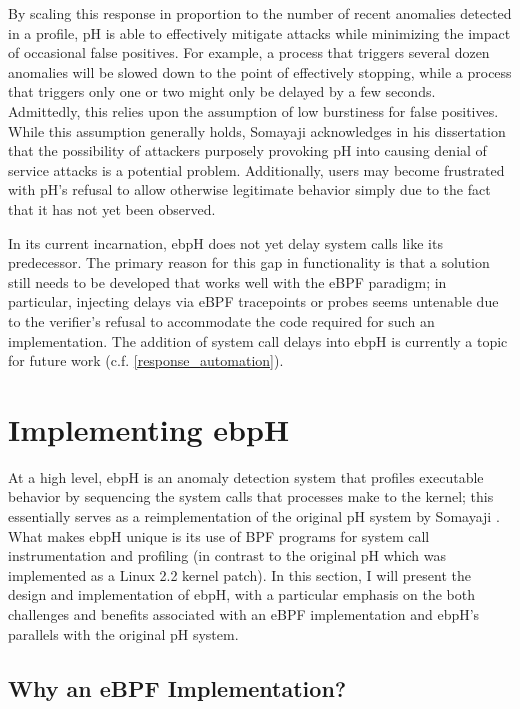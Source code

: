 \documentclass[
  12pt]{findlay}
\begin{document}
By scaling this response in proportion to the number of recent anomalies
detected in a profile, pH is able to effectively mitigate attacks while
minimizing the impact of occasional false positives. For example, a
process that triggers several dozen anomalies will be slowed down to the
point of effectively stopping, while a process that triggers only one or
two might only be delayed by a few seconds. Admittedly, this relies upon
the assumption of low burstiness for false positives. While this
assumption generally holds, Somayaji acknowledges in his dissertation
\autocite{soma02} that the possibility of attackers purposely provoking
pH into causing denial of service attacks is a potential problem.
Additionally, users may become frustrated with pH's refusal to allow
otherwise legitimate behavior simply due to the fact that it has not yet
been observed.

In its current incarnation, ebpH does not yet delay system calls like
its predecessor. The primary reason for this gap in functionality is
that a solution still needs to be developed that works well with the
eBPF paradigm; in particular, injecting delays via eBPF tracepoints or
probes seems untenable due to the verifier's refusal to accommodate the
code required for such an implementation. The addition of system call
delays into ebpH is currently a topic for future work (c.f.
\autoref{response_automation}).

\hypertarget{implementing-ebph}{%
\section{Implementing ebpH}\label{implementing-ebph}}

\label{sec:impl}

At a high level, ebpH is an anomaly detection system that profiles
executable behavior by sequencing the system calls that processes make
to the kernel; this essentially serves as a reimplementation of the
original pH system by Somayaji \autocite{soma02}. What makes ebpH unique
is its use of BPF programs for system call instrumentation and profiling
(in contrast to the original pH which was implemented as a Linux 2.2
kernel patch). In this section, I will present the design and
implementation of ebpH, with a particular emphasis on the both
challenges and benefits associated with an eBPF implementation and
ebpH's parallels with the original pH system.

\hypertarget{why-an-ebpf-implementation}{%
\subsection{Why an eBPF
Implementation?}\label{why-an-ebpf-implementation}}
\end{document}
